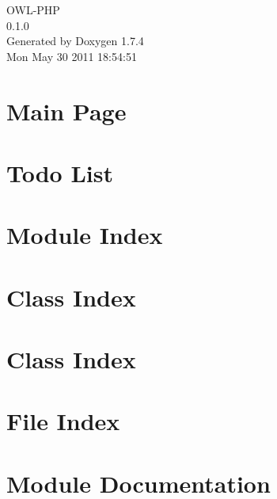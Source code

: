 \documentclass[a4paper]{book}
\begin{document}
\begin{titlepage}
\vspace*{7cm}
\begin{center}
{\Large OWL-\/PHP \\[1ex]\large 0.1.0 }\\
\vspace*{1cm}
{\large Generated by Doxygen 1.7.4}\\
\vspace*{0.5cm}
{\small Mon May 30 2011 18:54:51}\\
\end{center}
\end{titlepage}
\clearemptydoublepage
{}
\tableofcontents
\clearemptydoublepage
{}
\chapter{Main Page}
\label{index}
\chapter{Todo List}
\label{todo}

\chapter{Module Index}

\chapter{Class Index}

\chapter{Class Index}

\chapter{File Index}

\chapter{Module Documentation}




























\end{document}
